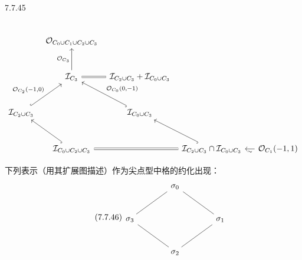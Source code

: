 \begin{exam}{7.7.45}
{\[\begin{tikzcd}[column sep=tiny,row sep=large]
\end{tikzcd}
\]}
{\small
\[
\begin{tikzcd}[column sep=tiny,row sep=large]
 & \OO_{C_0\cup C_1\cup C_2\cup C_3} & & \\
 & \mathcal I_{C_3}\arrow[u,"\OO_{C_3}"]\arrow[r,equal,no head] & \mathcal I_{C_2\cup C_3}+\mathcal I_{C_0\cup C_3} & \\
 \mathcal I_{C_2\cup C_3}\arrow[ur,hook,"{\OO_{C_2}(-1,0)}"] & & \mathcal I_{C_0\cup C_3}\arrow[ul,hook,"{\OO_{C_0}(0,-1)}"'] & \\
 & \mathcal I_{C_0\cup C_2\cup C_3}\arrow[ul,hook]\arrow[rr,equal,no head] & & \mathcal I_{C_2\cup C_3}\cap\mathcal I_{C_0\cup C_3}\arrow[ul,hook] & & \OO_{C_1}(-1,1)\arrow[ll,"\sim"]
\end{tikzcd}
\]}
\end{exam}

下列表示（用其扩展图描述）作为尖点型中格的约化出现：
\begin{equation}\tag{7.7.46}
\begin{tikzcd}[column sep=large,row sep=large]
& \sigma_0\arrow[dl,no head]\arrow[dr,no head] & \\
\sigma_3\arrow[dr,no head] & & \sigma_1\arrow[dl,no head]\\
& \sigma_2 &
\end{tikzcd}
\end{equation}

